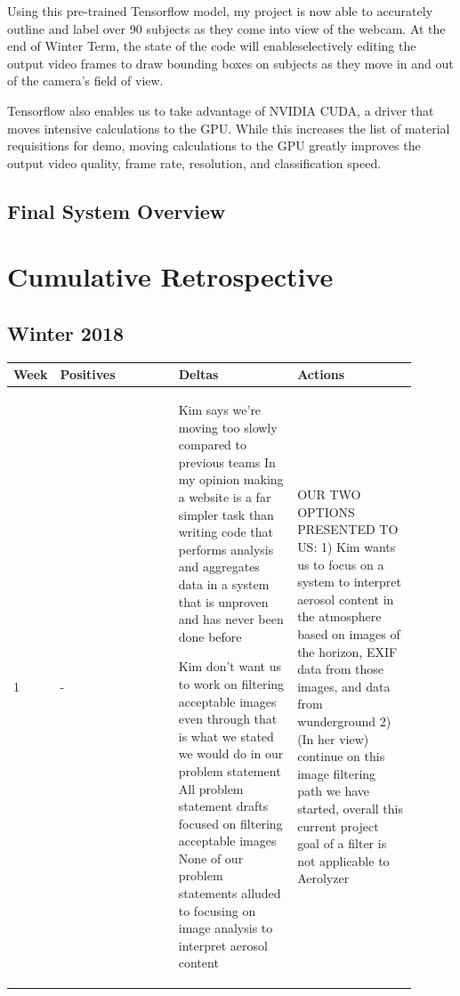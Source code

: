 \documentclass[onecolumn, draftclsnofoot,10pt, compsoc]{IEEEtran}
\begin{document}
\begin{singlespace}
			Using this pre-trained Tensorflow model, my project is now able to accurately outline and label over 90 subjects as they come into view of the webcam.
			At the end of Winter Term, the state of the code will enableselectively editing the output video frames to draw bounding boxes on subjects as they move in and out of the camera's field of view.


			Tensorflow also enables us to take advantage of NVIDIA CUDA, a driver that moves intensive calculations to the GPU.
			While this increases the list of material requisitions for demo, moving calculations to the GPU greatly improves the output video quality, frame rate, resolution, and classification speed. \cite{nvidia}
			
	\subsection{Final System Overview}

	\clearpage

	\section{Cumulative Retrospective}
		\subsection{Winter 2018}
		\begin{longtable}{|l|p{0.3\linewidth}|p{0.3\linewidth}|p{0.3\linewidth}|}\hline \textbf{Week} & \textbf{Positives} & \textbf{Deltas} & \textbf{Actions}\\\hline
		1 	&
			-
			&
				Kim says we're moving too slowly compared to previous teams
				In my opinion making a website is a far simpler task than writing code that performs analysis  and aggregates data in a system that is unproven and has never been done before

				Kim don't want us to work on filtering acceptable images even through that is what we stated we would do in our problem statement
				All problem statement drafts focused on filtering acceptable images
				None of our problem statements alluded to focusing on image analysis to interpret aerosol content
			&
				OUR TWO OPTIONS PRESENTED TO US:
				1) Kim wants us to focus on a system to interpret aerosol content in the atmosphere based on images of the horizon, EXIF data from those images, and data from wunderground
				2) (In her view) continue on this image filtering path we have started, overall this current project goal of a filter is not applicable to Aerolyzer


\end{longtable}
\end{singlespace}
\end{document}
